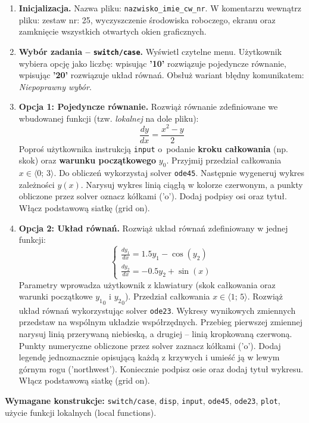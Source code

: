 \documentclass[a4paper,11pt]{article}
\begin{document}
\begin{enumerate}[leftmargin=*, label=\textbf{\arabic*.}, itemsep=2pt]

  \item \textbf{Inicjalizacja.}
    Nazwa pliku: \texttt{nazwisko\_imie\_cw\_nr}. W komentarzu wewnątrz pliku: zestaw nr: 25, wyczyszczenie środowiska roboczego, ekranu oraz zamknięcie wszystkich otwartych okien graficznych.

  \item \textbf{Wybór zadania -- \texttt{switch/case}.}
    Wyświetl czytelne menu. Użytkownik wybiera opcję jako liczbę: wpisując \textbf{'10'} rozwiązuje pojedyncze równanie, wpisując \textbf{'20'} rozwiązuje układ równań. Obsłuż wariant błędny komunikatem: \textit{Niepoprawny wybór}.

  \item \textbf{Opcja 1: Pojedyncze równanie.}
    Rozwiąż równanie zdefiniowane we wbudowanej funkcji (tzw. \textit{lokalnej} na dole pliku):
    \[ \frac{dy}{dx} = \frac{x^2 - y}{2} \]
    Poproś użytkownika instrukcją \texttt{input} o~podanie \textbf{kroku całkowania} (np. skok) oraz \textbf{warunku początkowego} $y_0$. Przyjmij przedział całkowania $x \in \langle 0;\,3 \rangle$.
    Do obliczeń wykorzystaj solver \texttt{ode45}. Następnie wygeneruj wykres zależności $y(x)$. Narysuj wykres linią ciągłą w kolorze czerwonym, a punkty obliczone przez solver oznacz kółkami ('o'). Dodaj podpisy osi oraz tytuł. Włącz podstawową siatkę (grid on).

  \item \textbf{Opcja 2: Układ równań.}
    Rozwiąż układ równań zdefiniowany w jednej funkcji:\\[-0.5em]
    \[
    \begin{cases}
      \frac{dy_1}{dx} = 1.5y_1 - \cos(y_2) \\
      \frac{dy_2}{dx} = -0.5y_2 + \sin(x)
    \end{cases}
    \]
    Parametry wprowadza użytkownik z klawiatury (skok całkowania oraz warunki początkowe $ {y_1}_{0} $ i $ {y_2}_{0} $). Przedział całkowania $x \in \langle 1;\,5 \rangle$.
    Rozwiąż układ równań wykorzystując solver \texttt{ode23}. Wykresy wynikowych zmiennych przedstaw na wspólnym układzie współrzędnych. Przebieg pierwszej zmiennej narysuj linią przerywaną niebieską, a drugiej -- linią kropkowaną czerwoną. Punkty numeryczne obliczone przez solver zaznacz kółkami ('o'). Dodaj legendę jednoznacznie opisującą każdą z krzywych i umieść ją w lewym górnym rogu ('northwest'). Koniecznie podpisz osie oraz dodaj tytuł wykresu. Włącz podstawową siatkę (grid on).

\end{enumerate}

\vspace{0.3cm}
\begin{ramka}
\textbf{Wymagane konstrukcje:}
\texttt{switch/case}, \texttt{disp}, \texttt{input}, \texttt{ode45}, \texttt{ode23}, \texttt{plot}, użycie funkcji lokalnych (local functions).
\end{ramka}
\end{document}
